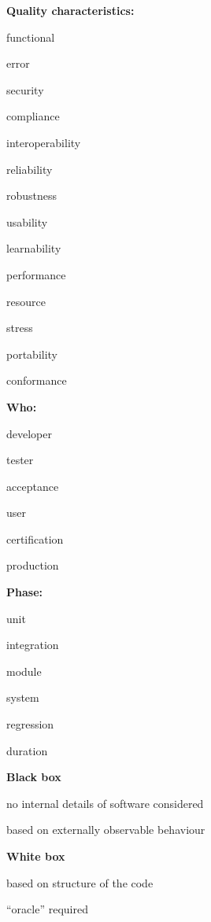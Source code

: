 \textbf{Quality characteristics:}
\begin{itemize*}
	\item functional
	\item error
	\item security
	\item compliance
	\item interoperability
	\item reliability
	\item robustness
	\item usability
	\item learnability
	\item performance
	\item resource
	\item stress
	\item portability
	\item conformance
\end{itemize*}

\textbf{Who:}
\begin{itemize*}
	\item developer
	\item tester
	\item acceptance
	\item user
	\item certification
	\item production
\end{itemize*}

\textbf{Phase:}
\begin{itemize*}
	\item unit
	\item integration
	\item module
	\item system
	\item regression
	\item duration
\end{itemize*}

\textbf{Black box}
\begin{itemize*}
	\item no internal details of software considered
	\item based on externally observable behaviour
\end{itemize*}

\textbf{White box}
\begin{itemize*}
	\item based on structure of the code
	\item “oracle” required
\end{itemize*}

